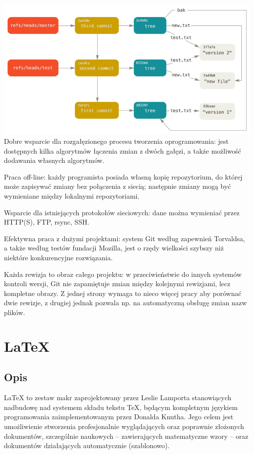 \documentclass{article}
\begin{document}
\includegraphics[width=1\textwidth]{git.png}
Dobre wsparcie dla rozgałęzionego procesu tworzenia oprogramowania: jest dostępnych kilka algorytmów łączenia zmian z dwóch gałęzi, a także możliwość dodawania własnych algorytmów.

Praca off-line: każdy programista posiada własną kopię repozytorium, do której może zapisywać zmiany bez połączenia z siecią; następnie zmiany mogą być wymieniane między lokalnymi repozytoriami.

Wsparcie dla istniejących protokołów sieciowych: dane można wymieniać przez HTTP(S), FTP, rsync, SSH.

Efektywna praca z dużymi projektami: system Git według zapewnień Torvaldsa, a także według testów fundacji Mozilla, jest o rzędy wielkości szybszy niż niektóre konkurencyjne rozwiązania.

Każda rewizja to obraz całego projektu: w przeciwieństwie do innych systemów kontroli wersji, Git nie zapamiętuje zmian między kolejnymi rewizjami, lecz kompletne obrazy. Z jednej strony wymaga to nieco więcej pracy aby porównać dwie rewizje, z drugiej jednak pozwala np. na automatyczną obsługę zmian nazw plików.
\newpage
\section{LaTeX}
\subsection{Opis}
LaTeX to zestaw makr zaprojektowany przez Leslie Lamporta stanowiących nadbudowę nad systemem składu tekstu TeX, będącym kompletnym językiem programowania zaimplementowanym przez Donalda Knutha. Jego celem jest umożliwienie stworzenia profesjonalnie wyglądających oraz poprawnie złożonych dokumentów, szczególnie naukowych – zawierających matematyczne wzory – oraz dokumentów działających automatycznie (szablonowo).\linebreak
\end{document}
